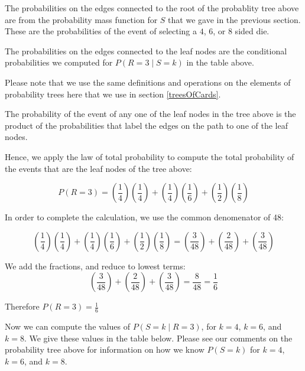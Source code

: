 \documentclass[a4paper,11pt]{article}
\begin{document}
The probabilities on the edges connected to the root of the probablity
tree above are from the probability mass function for $S$ that we
gave in the previous section.  These are the probabilities of the event
of selecting a $4$, $6$, or $8$ sided die.

The probabilities on the edges connected to the leaf nodes are the 
conditional probabilities we computed for 
$P \left( R=3 \mid S=k \right)$ in the table above.

Please note that we use the same definitions and operations on the 
elements of probability trees here that we use in section 
\ref{treesOfCards}.

The probability of the event of any one of the leaf nodes in the tree
above is the product of the probabilities that label the edges on the
path to one of the leaf nodes.

Hence, we apply the law of total probability to compute the total probability
of the events that are the leaf nodes of the tree above:

\begin{equation}
P \left( R=3 \right) = 
  \left( \frac{1}{4} \right) \left( \frac{1}{4} \right) +
  \left( \frac{1}{4} \right) \left( \frac{1}{6} \right) +
  \left( \frac{1}{2} \right) \left( \frac{1}{8} \right)
\end{equation}

In order to complete the calculation, we use the common denomenator
of 48:

\begin{equation} 
  \left( \frac{1}{4} \right) \left( \frac{1}{4} \right) +
  \left( \frac{1}{4} \right) \left( \frac{1}{6} \right) +
  \left( \frac{1}{2} \right) \left( \frac{1}{8} \right)
= 
  \left( \frac{3}{48} \right) +
  \left( \frac{2}{48} \right) +
  \left( \frac{3}{48} \right)
\end{equation}

We add the fractions, and reduce to lowest terms:
\begin{equation} 
  \left( \frac{3}{48} \right) +
  \left( \frac{2}{48} \right) +
  \left( \frac{3}{48} \right)
= \frac{8}{48} = \frac{1}{6}
\end{equation}

Therefore $P \left(R = 3 \right) = \frac{1}{6}$

Now we can compute the values of $P \left( S = k \mid R = 3\right)$, for
$k=4$, $k=6$, and $k=8$. We give these values in the table below.
Please see our comments on the probability tree above for information on
how we know $P\left(S=k \right)$ for $k=4$, $k=6$, and $k=8$.
\end{document}
